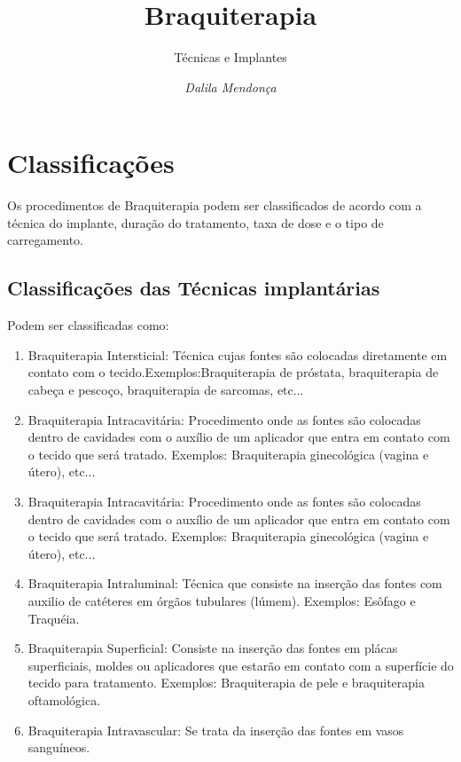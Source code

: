 \documentclass[12pt,a4paper]{article}
\title{Braquiterapia}
\author{Técnicas e Implantes\cite{devlin2015}}
\date{\textit{Dalila Mendonça}}
\begin{document}
	\maketitle
	\onehalfspacing



	\section{Classificações}

	Os procedimentos de Braquiterapia podem ser classificados de acordo com a técnica do implante, duração do tratamento, taxa de dose e o tipo de carregamento.

	\subsection{Classificações das Técnicas implantárias}

	Podem ser classificadas como:

	\begin{enumerate}
		\item Braquiterapia Intersticial: Técnica cujas fontes são colocadas diretamente em contato com o tecido.Exemplos:Braquiterapia de próstata, braquiterapia de cabeça e pescoço, braquiterapia de sarcomas, etc...
		
		\item Braquiterapia Intracavitária:  Procedimento onde as fontes são colocadas dentro de cavidades com o auxílio de um aplicador que entra em contato com o tecido que será tratado. Exemplos: Braquiterapia ginecológica (vagina e útero), etc...
		
		\item Braquiterapia Intracavitária:  Procedimento onde as fontes são colocadas dentro de cavidades com o auxílio de um aplicador que entra em contato com o tecido que será tratado. Exemplos: Braquiterapia ginecológica (vagina e útero), etc...
		
		\item Braquiterapia Intraluminal: Técnica que consiste na inserção das fontes com auxilio de catéteres em órgãos tubulares (lúmem). Exemplos: Esôfago e Traquéia.
		
		\item Braquiterapia Superficial: Consiste na inserção das fontes em plácas superficiais, moldes ou aplicadores que estarão em contato com a superfície do tecido para tratamento. Exemplos: Braquiterapia de pele e braquiterapia oftamológica.
		
		\item Braquiterapia Intravascular: Se trata da inserção das fontes em vasos sanguíneos.

	\end{enumerate}
\end{document}
